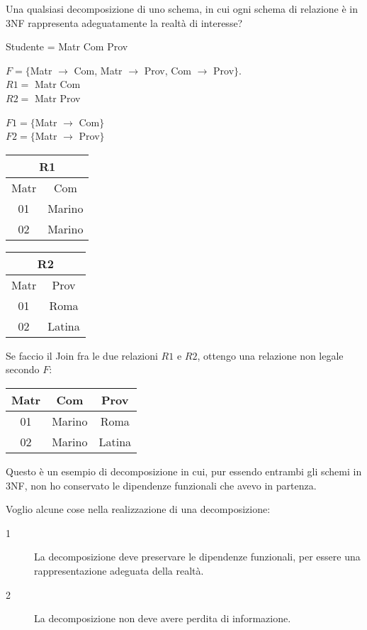 Una qualsiasi decomposizione di uno schema, in cui ogni schema di relazione \`e in 3NF rappresenta adeguatamente la realt\`a di interesse?

Studente = Matr Com Prov

$F = \{$Matr $\to$ Com, Matr $\to$ Prov, Com $\to$ Prov$\}$. \\
$R1 =$ Matr Com \\
$R2 =$ Matr Prov

$F1 = \{$Matr $\to$ Com$\}$ \\
$F2 = \{$Matr $\to$ Prov$\}$

\begin{center}
\begin{tabular}{|*{2}{c|}}
\hline
\multicolumn{2}{|c|}{R1} \\
\hline
Matr & Com \\
\hline
01 & Marino \\
\hline
02 & Marino \\
\hline
\end{tabular}
\qquad
\begin{tabular}{|*{2}{c|}}
\hline
\multicolumn{2}{|c|}{R2} \\
\hline
Matr & Prov \\
\hline
01 & Roma \\
\hline
02 & Latina \\
\hline
\end{tabular}
\end{center}

Se faccio il Join fra le due relazioni $R1$ e $R2$, ottengo una relazione non legale secondo $F$:

\begin{center}
\begin{tabular}{|*{3}{c|}}
\hline
Matr & Com & Prov \\
\hline
01 & Marino & Roma \\
\hline
02 & Marino & Latina \\
\hline
\end{tabular}
\end{center}

Questo \`e un esempio di decomposizione in cui, pur essendo entrambi gli schemi in 3NF, non ho conservato le dipendenze funzionali che avevo in partenza.

Voglio alcune cose nella realizzazione di una decomposizione:
\begin{description}
    \item[1\label{itm:dec_1}] La decomposizione deve preservare le dipendenze funzionali, per essere una rappresentazione adeguata della realt\`a.
    \item[2\label{itm:dec_2}] La decomposizione non deve avere perdita di informazione.
\end{description}

